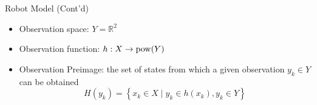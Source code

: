 \begin{frame}{Robot Model (Cont'd)}
  \begin{itemize}
  \item Observation space: $Y = \mathbb{R}^2$
  \item Observation function: $h : X \to \operatorname{pow}(Y) $
  \item Observation Preimage: the set of states from which a given observation
    $y_k \in Y$ can be obtained
        \begin{equation}
          H(y_k) = \left\{ x_k \in X \mid y_k \in h(x_k), y_k \in Y \right\}
        \end{equation}
        
  \end{itemize}
\end{frame}